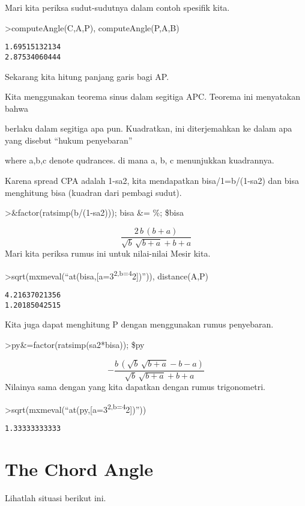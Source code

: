 \documentclass[
]{book}
\begin{document}
Mari kita periksa sudut-sudutnya dalam contoh spesifik kita.

\textgreater computeAngle(C,A,P), computeAngle(P,A,B)

\begin{verbatim}
1.69515132134
2.87534060444
\end{verbatim}

Sekarang kita hitung panjang garis bagi AP.

Kita menggunakan teorema sinus dalam segitiga APC. Teorema ini menyatakan bahwa

berlaku dalam segitiga apa pun. Kuadratkan, ini diterjemahkan ke dalam apa yang disebut ``hukum penyebaran''

where a,b,c denote qudrances. di mana a, b, c menunjukkan kuadrannya.

Karena spread CPA adalah 1-sa2, kita mendapatkan bisa/1=b/(1-sa2) dan bisa menghitung bisa (kuadran dari pembagi sudut).

\textgreater\&factor(ratsimp(b/(1-sa2))); bisa \&= \%; \$bisa

\[\frac{2\,b\,\left(b+a\right)}{\sqrt{b}\,\sqrt{b+a}+b+a}\]Mari kita periksa rumus ini untuk nilai-nilai Mesir kita.

\textgreater sqrt(mxmeval(``at(bisa,{[}a=3\textsuperscript{2,b=4}2{]})'')), distance(A,P)

\begin{verbatim}
4.21637021356
1.20185042515
\end{verbatim}

Kita juga dapat menghitung P dengan menggunakan rumus penyebaran.

\textgreater py\&=factor(ratsimp(sa2*bisa)); \$py

\[-\frac{b\,\left(\sqrt{b}\,\sqrt{b+a}-b-a\right)}{\sqrt{b}\,\sqrt{b+
 a}+b+a}\]Nilainya sama dengan yang kita dapatkan dengan rumus trigonometri.

\textgreater sqrt(mxmeval(``at(py,{[}a=3\textsuperscript{2,b=4}2{]})''))

\begin{verbatim}
1.33333333333
\end{verbatim}

\section{The Chord Angle}\label{the-chord-angle}

Lihatlah situasi berikut ini.
\end{document}
